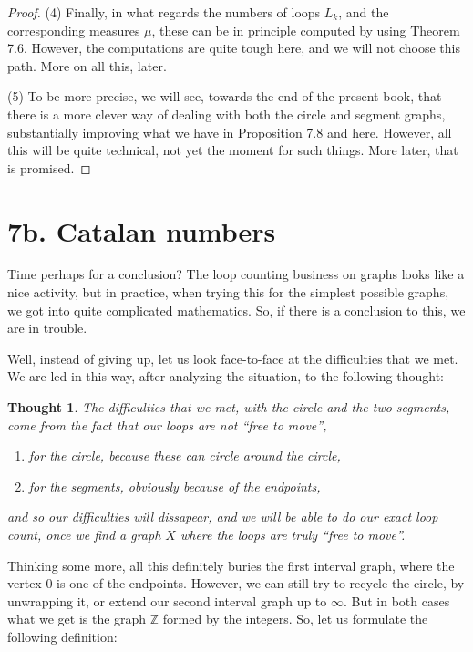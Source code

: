 \documentclass[12pt]{amsbook}
\newtheorem{thought}[theorem]{Thought}
\begin{document}
\begin{proof}
\medskip

(4) Finally, in what regards the numbers of loops $L_k$, and the corresponding measures $\mu$, these can be in principle computed by using Theorem 7.6. However, the computations are quite tough here, and we will not choose this path. More on all this, later.

\medskip

(5) To be more precise, we will see, towards the end of the present book, that there is a more clever way of dealing with both the circle and segment graphs, substantially improving what we have in Proposition 7.8 and here. However, all this will be quite technical, not yet the moment for such things. More later, that is promised.
\end{proof}

\section*{7b. Catalan numbers}

Time perhaps for a conclusion? The loop counting business on graphs looks like a nice activity, but in practice, when trying this for the simplest possible graphs, we got into quite complicated mathematics. So, if there is a conclusion to this, we are in trouble.

\bigskip

Well, instead of giving up, let us look face-to-face at the difficulties that we met. We are led in this way, after analyzing the situation, to the following thought:

\begin{thought}
The difficulties that we met, with the circle and the two segments, come from the fact that our loops are not ``free to move'',
\begin{enumerate}
\item for the circle, because these can circle around the circle,

\item for the segments, obviously because of the endpoints,
\end{enumerate}
and so our difficulties will dissapear, and we will be able to do our exact loop count, once we find a graph $X$ where the loops are truly ``free to move''.
\end{thought}

Thinking some more, all this definitely buries the first interval graph, where the vertex $0$ is one of the endpoints. However, we can still try to recycle the circle, by unwrapping it, or extend our second interval graph up to $\infty$. But in both cases what we get is the graph $\mathbb Z$ formed by the integers. So, let us formulate the following definition:
\end{document}
